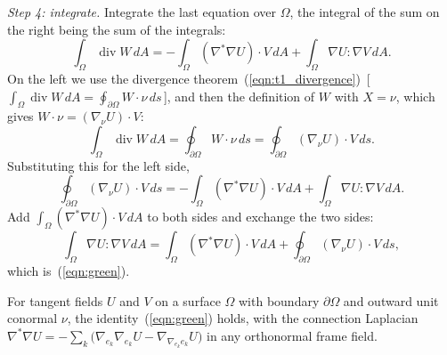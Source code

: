 \emph{Step 4: integrate.} Integrate the last equation over $\Omega$, the integral of the sum on the right being the sum of the integrals:
\begin{equation*}
\int_\Omega \operatorname{div} W\, dA = -\int_\Omega (\nabla^*\nabla U)\cdot V\, dA + \int_\Omega \nabla U : \nabla V\, dA .
\end{equation*}
On the left we use the divergence theorem~(\ref{eqn:t1_divergence})~[\,$\int_\Omega\operatorname{div}W\,dA = \oint_{\partial\Omega}W\cdot\nu\,ds$\,], and then the definition of $W$ with $X = \nu$, which gives $W\cdot\nu = (\nabla_\nu U)\cdot V$:
\begin{equation*}
\int_\Omega \operatorname{div} W\, dA = \oint_{\partial\Omega} W\cdot\nu\, ds = \oint_{\partial\Omega} (\nabla_\nu U)\cdot V\, ds .
\end{equation*}
Substituting this for the left side,
\begin{equation*}
\oint_{\partial\Omega} (\nabla_\nu U)\cdot V\, ds = -\int_\Omega (\nabla^*\nabla U)\cdot V\, dA + \int_\Omega \nabla U : \nabla V\, dA .
\end{equation*}
Add $\int_\Omega (\nabla^*\nabla U)\cdot V\, dA$ to both sides and exchange the two sides:
\begin{equation*}
\int_\Omega \nabla U : \nabla V\, dA = \int_\Omega (\nabla^*\nabla U)\cdot V\, dA + \oint_{\partial\Omega} (\nabla_\nu U)\cdot V\, ds ,
\end{equation*}
which is~(\ref{eqn:green}).
\begin{prop}
\label{prop:green}
For tangent fields $U$ and $V$ on a surface $\Omega$ with boundary $\partial \Omega$ and outward unit conormal $\nu$, the identity~(\ref{eqn:green}) holds, with the connection Laplacian $\nabla^* \nabla U = -\sum_k \big( \nabla_{e_k} \nabla_{e_k} U - \nabla_{\nabla_{e_k} e_k} U \big)$ in any orthonormal frame field.
\end{prop}


